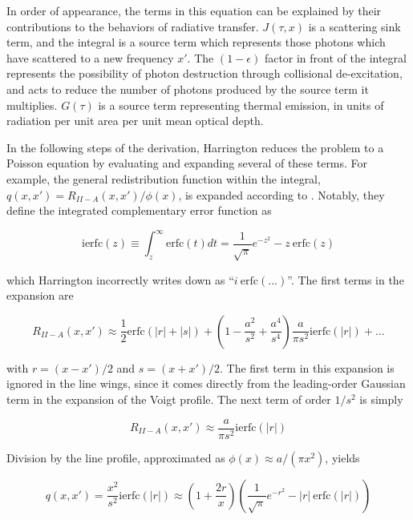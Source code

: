 \documentclass[onecolumn]{aastex63}
\begin{document}
In order of appearance, the terms in this equation can be explained by their contributions to the behaviors of radiative transfer. $J(\tau, x)$ is a scattering sink term, and the integral is a source term which represents those photons which have scattered to a new frequency $x'$. The $(1-\epsilon)$ factor in front of the integral represents the possibility of photon destruction through collisional de-excitation, and acts to reduce the number of photons produced by the source term it multiplies. $G(\tau)$ is a source term representing thermal emission, in units of radiation per unit area per unit mean optical depth. 

In the following steps of the derivation, Harrington reduces the problem to a Poisson equation by evaluating and expanding several of these terms. For example, the general redistribution function within the integral, $q(x, x') = R_{II-A}(x, x')/\phi (x)$, is expanded according to \cite{1971JQSRT..11.1365A}. Notably, they define the integrated complementary error function as 

\begin{equation}
    \mathrm{ierfc}(z) \equiv \int_z^{\infty} \mathrm{erfc}(t) dt = \frac{1}{\sqrt{\pi}} e^{-z^2} - z\  \mathrm{erfc}(z)
\end{equation}

which Harrington incorrectly writes down as ``$i\ \mathrm{erfc(...)}$''. The first terms in the expansion are 


\begin{equation}
    R_{II-A}(x, x') \approx \frac{1}{2}\mathrm{erfc}(|r|+|s|) + \left(1 - \frac{a^2}{s^2} + \frac{a^4}{s^4}\right) \frac{a}{\pi s^2} \mathrm{ierfc}(|r|) + ...
\end{equation}

with $r=(x-x')/2$ and $s=(x+x')/2$. The first term in this expansion is ignored in the line wings, since it comes directly from the leading-order Gaussian term in the expansion of the Voigt profile. The next term of order $1/s^2$ is simply

\begin{equation}
    R_{II-A}(x, x') \approx \frac{a}{\pi s^2}\mathrm{ierfc}(|r|)
\end{equation}

Division by the line profile, approximated as $\phi(x) \approx a/(\pi x^2)$, yields

\begin{equation}
    q(x, x') = \frac{x^2}{s^2} \mathrm{ierfc}(|r|) \approx \left(1+\frac{2r}{x}\right)\left(\frac{1}{\sqrt{\pi}}e^{-r^2} - |r|\ \mathrm{erfc}(|r|)\right)
\end{equation}
\end{document}
